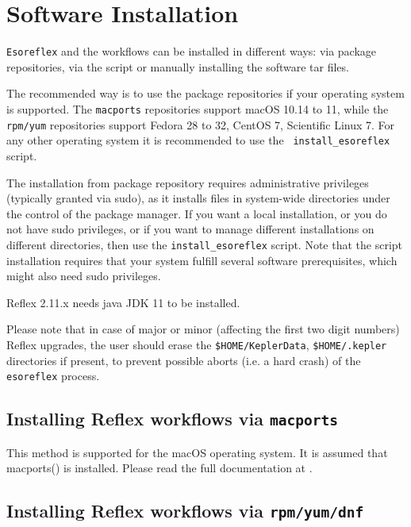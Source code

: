 \section{Software Installation}\label{Sec:Software_Installation}

{\tt Esoreflex} and the workflows can be installed in different ways:
via package repositories, via the
script or manually installing the software tar files.

 The recommended way is to use the package repositories if your
 operating system is supported. The {\tt macports} repositories
 support macOS 10.14 to 11, while the {\tt rpm/yum} repositories
 support Fedora 28 to 32, CentOS 7, Scientific Linux 7. For any other
 operating system it is recommended to use the {\tt
   install\_esoreflex} script.  

 The installation from package repository requires administrative privileges
 (typically granted via sudo), as it installs files in system-wide directories 
 under the control of the package manager. If you want a local
 installation, or you do not have sudo privileges, or if you want to
 manage different installations on different directories, then use the
 {\tt install\_esoreflex} script. Note that the script installation
 requires that your system fulfill several software prerequisites,
 which might also need sudo privileges.
 
 Reflex 2.11.x needs java JDK 11 to be installed.
 
 Please note that in case of major or minor (affecting the first two
 digit numbers) Reflex upgrades, the user should erase the
 \verb+$HOME/KeplerData+, \verb+$HOME/.kepler+ directories if present,
 to prevent possible aborts (i.e. a hard crash) of the {\tt esoreflex}
 process.

 
\subsection{Installing Reflex workflows via \texorpdfstring{{\tt macports}}{macports} }

 This method is supported for the macOS operating system. It is assumed that
 macports\linebreak () is installed.
 Please read the full documentation at \newline
 .

\subsection{Installing Reflex workflows via \texorpdfstring{{\tt rpm/yum/dnf}}{rpm/yum/dnf} }

